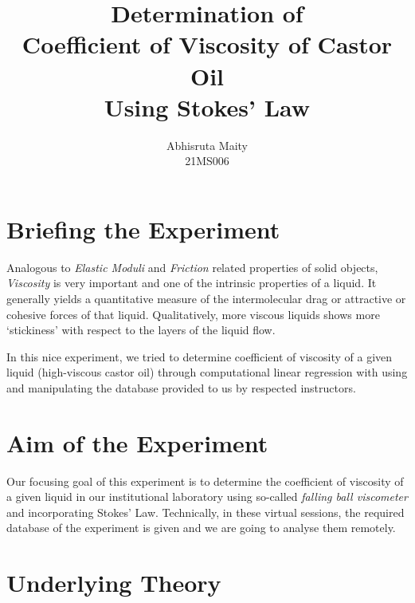 \documentclass[11pt, a4paper, abstract=true]{scrartcl}
\begin{document}
\subject{
    PH1102: Experiment III
}
\title{
    \huge Determination of \\
    Coefficient of Viscosity of Castor Oil \\ 
    Using Stokes' Law
}
\author{
    Abhisruta Maity \\
    {\normalsize 21MS006}
}
\date{}
\publishers{
    \normalsize \emph{Indian Institute of Science Education and Research, Kolkata \\
    Mohanpur, West Bengal, 741246, India}
}
\maketitle

\tableofcontents

\newpage

\section{Briefing the Experiment}
Analogous to \emph{Elastic Moduli} and \emph{Friction} related properties of solid objects, \emph{Viscosity} is very important and one of the intrinsic properties of a liquid. It generally yields a quantitative measure of the intermolecular drag or attractive or cohesive forces of that liquid. Qualitatively, more viscous liquids shows more `stickiness' with respect to the layers of the liquid flow.

In this nice experiment, we tried to determine coefficient of viscosity of a given liquid (high-viscous castor oil) through computational linear regression with using and manipulating the database provided to us by respected instructors.


\section{Aim of the Experiment}
Our focusing goal of this experiment is to determine the coefficient of viscosity of a given liquid in our institutional laboratory using so-called \emph{falling ball viscometer} and incorporating Stokes' Law. Technically, in these virtual sessions, the required database of the experiment is given and we are going to analyse them remotely.

\section{Underlying Theory}
\end{document}
